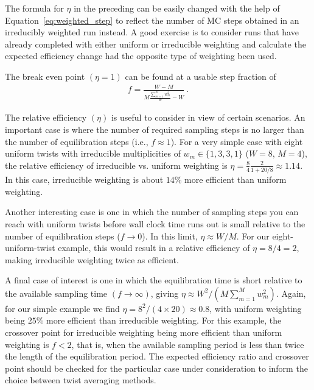 The formula for $\eta$ in the preceding can be easily changed with the help of 
Equation~\ref{eq:weighted_step} to reflect the 
number of MC steps obtained in an irreducibly weighted run 
instead.  A good exercise is to consider runs that have already completed 
with either uniform or irreducible weighting and calculate the 
expected efficiency change had the opposite type of weighting been used.

The break even point $(\eta=1)$ can be found at a usable step fraction of 
\begin{align}
  f=\frac{W-M}{M\frac{\sum_{m=1}^Mw_m^2}{W}-W}\:.
\end{align}

The relative efficiency $(\eta)$ is useful to consider in view of certain 
scenarios.  An important case is where the number of required sampling 
steps is no larger than the number of equilibration steps (i.e., 
$f\approx 1$).  For a very simple case with eight uniform twists with 
irreducible multiplicities of $w_m\in\{1,3,3,1\}$ ($W=8$, $M=4$), the 
relative efficiency of irreducible vs. uniform weighting is 
$\eta=\frac{8}{4}\frac{2}{1+20/8}\approx 1.14$.  In this case, 
irreducible weighting is about $14$\% more efficient than uniform weighting.

Another interesting case is one in which the number of sampling steps you can 
reach with uniform twists before wall clock time runs out is small 
relative to the number of equilibration steps ($f\rightarrow 0$). 
In this limit, $\eta\approx W/M$.  For our eight-uniform-twist example, this would 
result in a relative efficiency of $\eta=8/4=2$, making irreducible 
weighting twice as efficient.

A final case of interest is one in which the equilibration time is short 
relative to the available sampling time $(f\rightarrow\infty)$, 
giving $\eta\approx W^2/(M\sum_{m=1}^Mw_m^2)$.  Again, for our simple example 
we find $\eta=8^2/(4\times 20)\approx 0.8$, with uniform weighting being 
$25$\% more efficient than irreducible weighting. For this example, the crossover point for irreducible weighting being 
more efficient than uniform weighting is $f<2$, that is, when the 
available sampling period is less than twice the length of the equilibration 
period.  The expected efficiency ratio and crossover point should be checked 
for the particular case under consideration to inform the choice between   
twist averaging methods.



